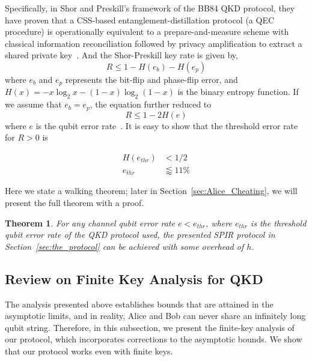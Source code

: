 \documentclass[%
 reprint,
superscriptaddress,
 amsmath,amssymb,
 aps,
]{revtex4-2}
\newtheorem{theorem}{Theorem}[section]
\begin{document}
Specifically, in Shor and Preskill's framework of the BB84 QKD protocol, they have proven that a CSS-based entanglement-distillation protocol (a QEC procedure) is operationally equivalent to a prepare-and-measure scheme with classical information reconciliation followed by privacy amplification to extract a shared private key~\cite{Shor_Preskill_Proof1}. And the Shor-Preskill key rate is given by,
\begin{equation}
    R\le 1-H(e_b)-H(e_p)
\end{equation}
where $e_b$ and $e_p$ represents the bit-flip and phase-flip error, and $H(x)=-x\log_2x-(1-x)\log_2(1-x)$ is the binary entropy function. If we assume that $e_b=e_p$, the equation further reduced to
\begin{equation}
    R \le 1-2H(e)
\end{equation}
where $e$ is the qubit error rate~\cite{Shor_Preskill_Proof1}. It is easy to show that the threshold error rate for $R>0$ is

\begin{equation}
\begin{split}
    H(e_{thr})&<1/2\\
    e_{thr}&\lessapprox 11\%
\end{split}
\end{equation}

Here we state a walking theorem; later in Section~\ref{sec:Alice_Cheating}, we will present the full theorem with a proof.

\begin{theorem}
    For any channel qubit error rate $e<e_{thr}$, where $e_{thr}$ is the threshold qubit error rate of the QKD protocol used, the presented SPIR protocol in Section~\ref{sec:the_protocol} can be achieved with some overhead of $h$.
\label{thm:walking_theorem}
\end{theorem}

\subsection{Review on Finite Key Analysis for QKD}
\label{sec:Finite_key_analysis_qkd}
The analysis presented above establishes bounds that are attained in the asymptotic limits, and in reality, Alice and Bob can never share an infinitely long qubit string. Therefore, in this subsection, we present the finite-key analysis of our protocol, which incorporates corrections to the asymptotic bounds. We show that our protocol works even with finite keys.
\end{document}
